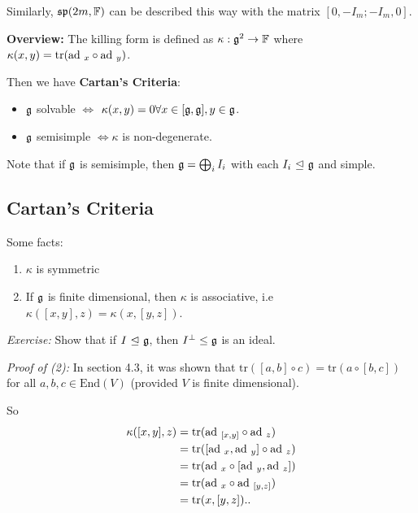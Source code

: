 Similarly, \(\mathfrak{sp}(2m, {\mathbb{F}})\) can be described this way with the
matrix \([0, -I_m; -I_m, 0]\).

\textbf{Overview:} The killing form is defined as
\(\kappa: {\mathfrak{g}}^2 \to {\mathbb{F}}\) where
\(\kappa(x, y) = \mathrm{tr}(\mathrm{ad}~_x \circ \mathrm{ad}~_y)\).

Then we have \textbf{Cartan's Criteria}:

\begin{itemize}
\tightlist
\item
  \({\mathfrak{g}}\) solvable \(\iff\)
  \(\kappa(x,y) = 0 \forall x\in [{\mathfrak{g}}, {\mathfrak{g}}], y\in {\mathfrak{g}}\).
\item
  \({\mathfrak{g}}\) semisimple \(\iff \kappa\) is non-degenerate.
\end{itemize}

Note that if \({\mathfrak{g}}\) is semisimple, then \({\mathfrak{g}} = \bigoplus_i I_i\)
with each \(I_i {~\trianglelefteq~} {\mathfrak{g}}\) and simple.

\hypertarget{cartans-criteria}{%
\subsection{Cartan's Criteria}\label{cartans-criteria}}

Some facts:

\begin{enumerate}
\def\labelenumi{\arabic{enumi}.}
\tightlist
\item
  \(\kappa\) is symmetric
\item
  If \({\mathfrak{g}}\) is finite dimensional, then \(\kappa\) is associative,
  i.e \(\kappa([x,y], z) = \kappa(x, [y, z])\).
\end{enumerate}

\emph{Exercise:} Show that if \(I {~\trianglelefteq~} {\mathfrak{g}}\), then
\(I^\perp \leq {\mathfrak{g}}\) is an ideal.

\emph{Proof of (2):} In section 4.3, it was shown that
\(\mathrm{tr}([a,b] \circ c) = \mathrm{tr}(a \circ [b, c])\) for all
\(a,b,c \in \mathrm{End}(V)\) (provided \(V\) is finite dimensional).

So \begin{align*}
\kappa([x,y], z) &= \mathrm{tr}(\mathrm{ad}~_{[x, y]} \circ \mathrm{ad}~_z) \\
&= \mathrm{tr}([\mathrm{ad}~_x, \mathrm{ad}~_y] \circ \mathrm{ad}~_z) \\
&= \mathrm{tr}(\mathrm{ad}~_x \circ [\mathrm{ad}~_y, \mathrm{ad}~_z]) \\
&= \mathrm{tr}(\mathrm{ad}~_x \circ \mathrm{ad}~_{[y, z]} ) \\
&= \mathrm{tr}(x, [y, z]).
.\end{align*}

